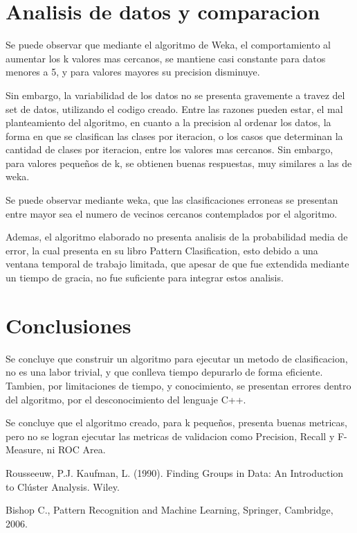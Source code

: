\documentclass[12pt,letterpaper]{article}
\begin{document}
\section{Analisis de datos y comparacion}

Se puede observar que mediante el algoritmo de Weka, el comportamiento al aumentar los k valores mas cercanos, se mantiene casi constante para datos menores a 5, y para valores mayores su precision disminuye.

Sin embargo, la variabilidad de los datos no se presenta gravemente a travez del set de datos, utilizando el codigo creado. Entre las razones pueden estar, el mal planteamiento del algoritmo, en cuanto a la precision al ordenar los datos, la forma en que se clasifican las clases por iteracion, o los casos que determinan la cantidad de clases por iteracion, entre los valores mas cercanos. Sin embargo, para valores pequeños de k, se obtienen buenas respuestas, muy similares a las de weka.

Se puede observar mediante weka, que las clasificaciones erroneas se presentan entre mayor sea el numero de vecinos cercanos contemplados por el algoritmo.

Ademas, el algoritmo elaborado no presenta analisis de la probabilidad media de error, la cual presenta \cite{duda} en su libro Pattern Clasification, esto debido a una ventana temporal de trabajo limitada, que apesar de que fue extendida mediante un tiempo de gracia, no fue suficiente para integrar estos analisis.


\section{Conclusiones}

Se concluye que construir un algoritmo para ejecutar un metodo de clasificacion, no es una labor trivial, y que conlleva tiempo depurarlo de forma eficiente. Tambien, por limitaciones de tiempo, y conocimiento, se presentan errores dentro del algoritmo, por el desconocimiento del lenguaje C++.

Se concluye que el algoritmo creado, para k pequeños, presenta buenas metricas, pero no se logran ejecutar las metricas de validacion como Precision, Recall y F-Measure, ni ROC Area.


\begin{thebibliography}{}


 Rousseeuw, P.J. Kaufman, L. (1990). Finding Groups in Data: An Introduction to Clúster Analysis. Wiley.

 Bishop C., Pattern Recognition and Machine Learning, Springer, Cambridge, 2006.

\end{thebibliography}
\end{document}

